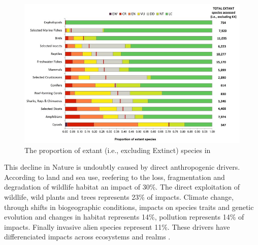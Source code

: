  \begin{figure}[H]
    \centering
    \includegraphics[width=0.9\linewidth]{figures/intro/IUCN_redlist}
    \caption{The proportion of extant (i.e., excluding Extinct) species in \citet{IUCN_redlist_2024}}
    \label{fig:intro_iucn}
\end{figure}

This decline in Nature is undoubtly caused by direct anthropogenic drivers. According to \cite{ipbes_2022_6417333} land and sea use, reefering to the loss, fragmentation and degradation of wildlife habitat an impact of 30\%. The direct exploitation of wildlife, wild plants and trees represents 23\% of impacts. Climate change, through shifts in biogeographic conditions, impacts on species traits and genetic evolution and changes in habitat  represents 14\%, pollution represents 14\% of impacts. Finally invasive alien species represent 11\%. These drivers have differenciated impacts across ecosystems and realms \citep{ipbes_2022_6417333}. 

